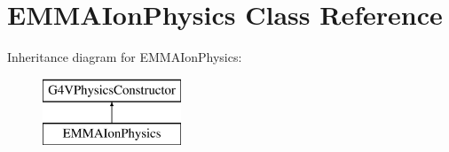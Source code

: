 \hypertarget{classEMMAIonPhysics}{\section{E\-M\-M\-A\-Ion\-Physics Class Reference}
\label{classEMMAIonPhysics}
}
Inheritance diagram for E\-M\-M\-A\-Ion\-Physics\-:\begin{figure}[H]
\begin{center}
\leavevmode
\includegraphics[height=2.000000cm]{classEMMAIonPhysics}
\end{center}
\end{figure}
